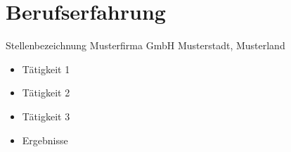 \section{Berufserfahrung}

        {Stellenbezeichnung}
        {Musterfirma GmbH}
        {Musterstadt, Musterland}
        {}   %
        {
        \begin{itemize}
            \item Tätigkeit 1
            \item Tätigkeit 2
            \item Tätigkeit 3
            \item Ergebnisse
        \end{itemize}
        }

